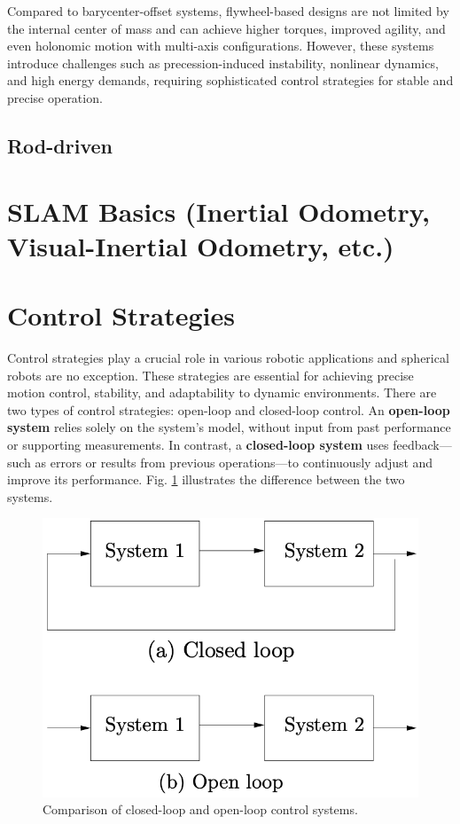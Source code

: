 \documentclass[english, bachelor, utf8]{base/thesis_telematics}
\begin{document}
Compared to barycenter-offset systems, flywheel-based designs are not limited by the internal center of mass and can achieve higher torques, improved agility, and even holonomic motion with multi-axis configurations.
However, these systems introduce challenges such as precession-induced instability, nonlinear dynamics, and high energy demands, requiring sophisticated control strategies for stable and precise operation.\cite{flywheel_hamaster_explanation}

\subsection{Rod-driven}




\section{SLAM Basics (Inertial Odometry, Visual-Inertial Odometry, etc.)}
\section{Control Strategies}
\label{sec:control-strategies}
Control strategies play a crucial role in various robotic applications and spherical robots are no exception.
These strategies are essential for achieving precise motion control, stability, and adaptability to dynamic environments.
There are two types of control strategies: open-loop and closed-loop control.
An \textbf{open-loop system} relies solely on the system's model, without input from past performance or supporting measurements. In contrast, a \textbf{closed-loop system} uses feedback---such as errors or results from previous operations---to continuously adjust and improve its performance. Fig. \ref{fig:control_systems} illustrates the difference between the two systems.\cite{feedbackBook,vectornav_math_controls}

\begin{figure}[ht]
\centering
\includegraphics[width=0.4\columnwidth]{pics/systems.png}
\caption{Comparison of closed-loop and open-loop control systems.\cite{feedbackBook}}
\label{fig:control_systems}
\end{figure}
\end{document}
